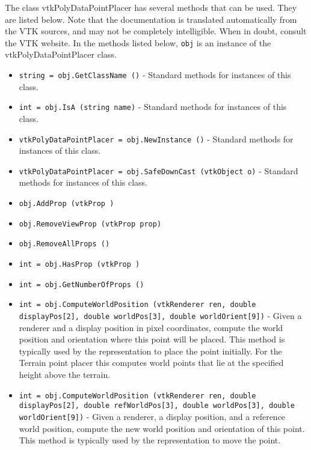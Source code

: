 The class vtkPolyDataPointPlacer has several methods that can be used.
  They are listed below.
Note that the documentation is translated automatically from the VTK sources,
and may not be completely intelligible.  When in doubt, consult the VTK website.
In the methods listed below, \verb|obj| is an instance of the vtkPolyDataPointPlacer class.
\begin{itemize}
\item  \verb|string = obj.GetClassName ()| -  Standard methods for instances of this class.

\item  \verb|int = obj.IsA (string name)| -  Standard methods for instances of this class.

\item  \verb|vtkPolyDataPointPlacer = obj.NewInstance ()| -  Standard methods for instances of this class.

\item  \verb|vtkPolyDataPointPlacer = obj.SafeDownCast (vtkObject o)| -  Standard methods for instances of this class.

\item  \verb|obj.AddProp (vtkProp )|

\item  \verb|obj.RemoveViewProp (vtkProp prop)|

\item  \verb|obj.RemoveAllProps ()|

\item  \verb|int = obj.HasProp (vtkProp )|

\item  \verb|int = obj.GetNumberOfProps ()|

\item  \verb|int = obj.ComputeWorldPosition (vtkRenderer ren, double displayPos[2], double worldPos[3], double worldOrient[9])| -  Given a renderer and a display position in pixel coordinates,
 compute the world position and orientation where this point
 will be placed. This method is typically used by the
 representation to place the point initially.
 For the Terrain point placer this computes world points that
 lie at the specified height above the terrain.

\item  \verb|int = obj.ComputeWorldPosition (vtkRenderer ren, double displayPos[2], double refWorldPos[3], double worldPos[3], double worldOrient[9])| -  Given a renderer, a display position, and a reference world
 position, compute the new world position and orientation 
 of this point. This method is typically used by the 
 representation to move the point.


\end{itemize}
